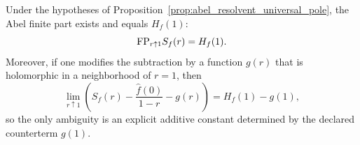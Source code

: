 \begin{corollary}
\label{cor:abel_fp_scheme_stable}
\MathTag Under the hypotheses of Proposition~\ref{prop:abel_resolvent_universal_pole}, the Abel finite part exists and equals $H_f(1)$:
\[
\mathrm{FP}_{r\uparrow 1} S_f(r)=H_f(1).
\]
Moreover, if one modifies the subtraction by a function $g(r)$ that is holomorphic in a neighborhood of $r=1$, then
\[
\lim_{r\uparrow 1}\left(S_f(r)-\frac{\widehat f(0)}{1-r}-g(r)\right)=H_f(1)-g(1),
\]
so the only ambiguity is an explicit additive constant determined by the declared counterterm $g(1)$.
\end{corollary}


